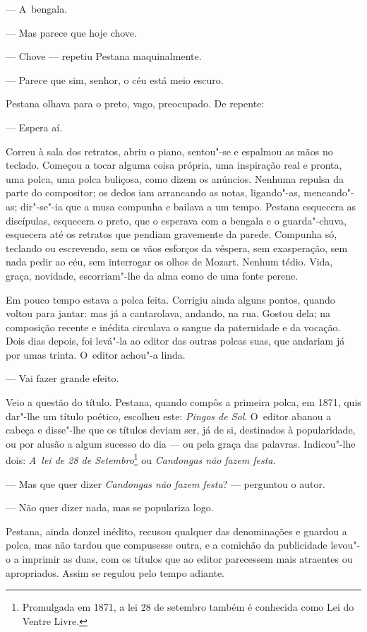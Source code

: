 \begin{linenumbers}
--- A~bengala.

--- Mas parece que hoje chove.

--- Chove --- repetiu Pestana maquinalmente.

--- Parece que sim, senhor, o céu está meio escuro.

Pestana olhava para o preto, vago, preocupado. De repente:

--- Espera aí.

Correu à sala dos retratos, abriu o piano, sentou"-se e espalmou as mãos
no teclado. Começou a tocar alguma coisa própria, uma inspiração real e
pronta, uma polca, uma polca buliçosa, como dizem os anúncios. Nenhuma
repulsa da parte do compositor; os dedos iam arrancando as notas,
ligando"-as, meneando"-as; dir"-se"-ia que a musa compunha e bailava a um
tempo. Pestana esquecera as discípulas, esquecera o preto, que o
esperava com a bengala e o guarda"-chuva, esquecera até os retratos que
pendiam gravemente da parede. Compunha só, teclando ou escrevendo, sem
os vãos esforços da véspera, sem exasperação, sem nada pedir ao céu, sem
interrogar os olhos de Mozart. Nenhum tédio. Vida, graça, novidade,
escorriam"-lhe da alma como de uma fonte perene.

Em pouco tempo estava a polca feita. Corrigiu ainda alguns pontos,
quando voltou para jantar: mas já a cantarolava, andando, na rua. Gostou
dela; na composição recente e inédita circulava o sangue da paternidade
e da vocação. Dois dias depois, foi levá"-la ao editor das outras polcas
suas, que andariam já por umas trinta. O~editor achou"-a linda.

--- Vai fazer grande efeito.

Veio a questão do título. Pestana, quando compôs a primeira polca, em
1871, quis dar"-lhe um título poético, escolheu este: \emph{Pingos de
Sol}. O~editor abanou a cabeça e disse"-lhe que os títulos deviam ser, já
de si, destinados à popularidade, ou por alusão a algum sucesso do dia
--- ou pela graça das palavras. Indicou"-lhe dois: \emph{A~lei de 28 de
Setembro}\footnote{Promulgada em 1871, a lei 28 de setembro também é
  conhecida como Lei do Ventre Livre.} ou \emph{Candongas não}
\emph{fazem festa.}

--- Mas que quer dizer \emph{Candongas não fazem festa}? --- perguntou o
autor.

--- Não quer dizer nada, mas se populariza logo.

Pestana, ainda donzel inédito, recusou qualquer das denominações e
guardou a polca, mas não tardou que compusesse outra, e a comichão da
publicidade levou"-o a imprimir as duas, com os títulos que ao editor
parecessem mais atraentes ou apropriados. Assim se regulou pelo tempo
adiante.


\end{linenumbers}
